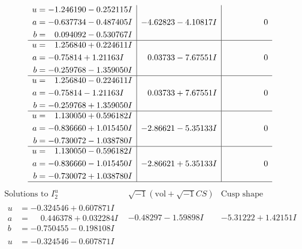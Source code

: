 \documentclass[1p]{elsarticle_modified}
\theoremstyle{definition}
\newcommand{\I}{\sqrt{-1}}
\begin{document}
$$\begin{array}{c|c|c}
\begin{aligned}
u &= -1.246190 - 0.252115 I \\
a &= -0.637734 - 0.487405 I \\
b &= \phantom{-}0.094092 - 0.530767 I\end{aligned}
 & -4.62823 - 4.10817 I & \phantom{-0.000000 } 0 \\ \hline\begin{aligned}
u &= \phantom{-}1.256840 + 0.224611 I \\
a &= -0.75814 + 1.21163 I \\
b &= -0.259768 - 1.359050 I\end{aligned}
 & \phantom{-}0.03733 - 7.67551 I & \phantom{-0.000000 } 0 \\ \hline\begin{aligned}
u &= \phantom{-}1.256840 - 0.224611 I \\
a &= -0.75814 - 1.21163 I \\
b &= -0.259768 + 1.359050 I\end{aligned}
 & \phantom{-}0.03733 + 7.67551 I & \phantom{-0.000000 } 0 \\ \hline\begin{aligned}
u &= \phantom{-}1.130050 + 0.596182 I \\
a &= -0.836660 + 1.015450 I \\
b &= -0.730072 - 1.038780 I\end{aligned}
 & -2.86621 - 5.35133 I & \phantom{-0.000000 } 0 \\ \hline\begin{aligned}
u &= \phantom{-}1.130050 - 0.596182 I \\
a &= -0.836660 - 1.015450 I \\
b &= -0.730072 + 1.038780 I\end{aligned}
 & -2.86621 + 5.35133 I & \phantom{-0.000000 } 0\\
 \hline 
 \end{array}$$\newpage$$\begin{array}{c|c|c}  
\text{Solutions to }I^u_{2}& \I (\text{vol} + \sqrt{-1}CS) & \text{Cusp shape}\\
 \hline 
\begin{aligned}
u &= -0.324546 + 0.607871 I \\
a &= \phantom{-}0.446378 + 0.032284 I \\
b &= -0.750455 - 0.198108 I\end{aligned}
 & -0.48297 - 1.59898 I & -5.31222 + 1.42151 I \\ \hline\begin{aligned}
u &= -0.324546 - 0.607871 I \\

\end{aligned}
\end{array}$$
\end{document}
